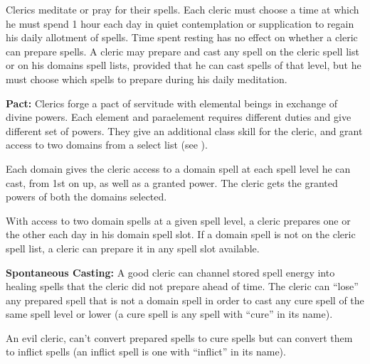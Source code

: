 Clerics meditate or pray for their spells. Each cleric must choose a time at which he must spend 1 hour each day in quiet contemplation or supplication to regain his daily allotment of spells. Time spent resting has no effect on whether a cleric can prepare spells. A cleric may prepare and cast any spell on the cleric spell list or on his domains spell lists, provided that he can cast spells of that level, but he must choose which spells to prepare during his daily meditation.




\textbf{Pact:} Clerics forge a pact of servitude with elemental beings in exchange of divine powers. Each element and paraelement requires different duties and give different set of powers. They give an additional class skill for the cleric, and grant access to two domains from a select list (see ).

Each domain gives the cleric access to a domain spell at each spell level he can cast, from 1st on up, as well as a granted power. The cleric gets the granted powers of both the domains selected.

With access to two domain spells at a given spell level, a cleric prepares one or the other each day in his domain spell slot. If a domain spell is not on the cleric spell list, a cleric can prepare it in any spell slot available. %

\textbf{Spontaneous Casting:} A good cleric can channel stored spell energy into healing spells that the cleric did not prepare ahead of time. The cleric can ``lose'' any prepared spell that is not a domain spell in order to cast any cure spell of the same spell level or lower (a cure spell is any spell with ``cure'' in its name).

An evil cleric, can't convert prepared spells to cure spells but can convert them to inflict spells (an inflict spell is one with ``inflict'' in its name).

